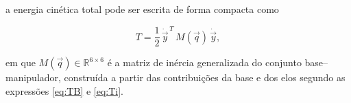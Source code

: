 a energia cinética total pode ser escrita de forma compacta como

\begin{equation}
T =
\frac{1}{2}\,\dot{\vec y}^{\,T}\,
M(\vec q)\,
\dot{\vec y},
\label{eq:T_quadratica_Mq}
\end{equation}

em que $M(\vec q)\in\mathbb{R}^{6\times 6}$ é a matriz de inércia generalizada do conjunto base--manipulador, construída a partir das contribuições da base e dos elos segundo as expressões \eqref{eq:TB} e \eqref{eq:Ti}.
